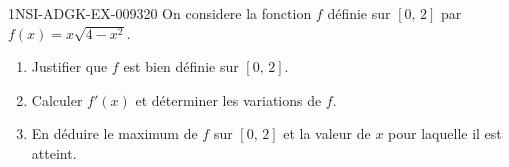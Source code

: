\begin{exercice}{1NSI-ADGK-EX-009}{3}{20}
On considere la fonction $f$ définie sur $[0,\, 2]$ par $f(x) = x\sqrt{4 - x^2}$.
\begin{enumerate}
  \item Justifier que $f$ est bien définie sur $[0,\, 2]$.
  \item Calculer $f'(x)$ et déterminer les variations de $f$.
  \item En déduire le maximum de $f$ sur $[0,\, 2]$ et la valeur de $x$ pour laquelle il est atteint.
\end{enumerate}

\end{exercice}
